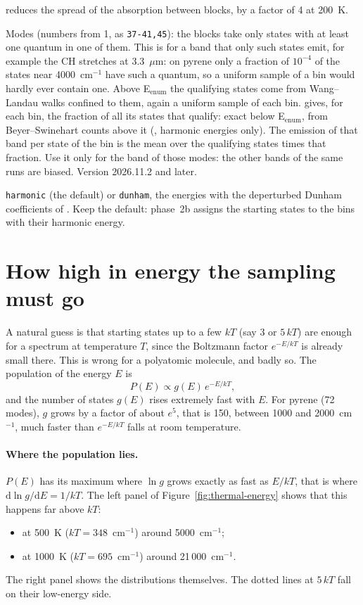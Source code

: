 \begin{description}
reduces the spread of the absorption between blocks, by a factor of 4
at 200~K.
\item[\flag{--require}] Modes (numbers from 1, as \texttt{37-41,45}): the
blocks take only states with at least one quantum in one of them. This is
for a band that only such states emit, for example the CH stretches at
3.3~$\mu$m: on pyrene only a fraction of $10^{-4}$ of the states near
4000~cm$^{-1}$ have such a quantum, so a uniform sample of a bin would
hardly ever contain one. Above E$_\mathrm{enum}$ the qualifying states
come from Wang--Landau walks confined to them, again a uniform sample of
each bin.  gives, for each bin, the fraction of
all its states that qualify: exact below E$_\mathrm{enum}$, from
Beyer--Swinehart counts above it (, harmonic energies
only). The emission of that band per state of the bin is the mean over the
qualifying states times that fraction. Use it only for the band of those
modes: the other bands of the same runs are biased. Version 2026.11.2 and
later.
\item[\flag{--energy}] \texttt{harmonic} (the default) or \texttt{dunham},
the energies with the deperturbed Dunham coefficients of
. Keep the default: phase~2b assigns the starting
states to the bins with their harmonic energy.
\end{description}

\section{How high in energy the sampling must go}\label{sec:thermal-howhigh}

A natural guess is that starting states up to a few $kT$ (say 3 or $5\,kT$)
are enough for a spectrum at temperature $T$, since the Boltzmann factor
$e^{-E/kT}$ is already small there. This is wrong for a polyatomic
molecule, and badly so. The population of the energy $E$ is
\[
P(E)\propto g(E)\,e^{-E/kT},
\]
and the number of states $g(E)$ rises extremely fast with $E$. For pyrene
(72 modes), $g$ grows by a factor of about $e^{5}$, that is 150, between
1000 and 2000~cm$^{-1}$, much faster than $e^{-E/kT}$ falls at room
temperature.

\paragraph{Where the population lies.} $P(E)$ has its maximum where
$\ln g$ grows exactly as fast as $E/kT$, that is where
$\mathrm{d}\ln g/\mathrm{d}E=1/kT$. The left panel of
Figure~\ref{fig:thermal-energy} shows that this happens far above $kT$:
\begin{itemize}
\item at 500~K ($kT=348$~cm$^{-1}$) around 5000~cm$^{-1}$;
\item at 1000~K ($kT=695$~cm$^{-1}$) around 21\,000~cm$^{-1}$.
\end{itemize}
The right panel shows the distributions themselves. The dotted lines at
$5\,kT$ fall on their low-energy side.

